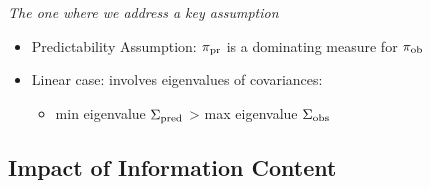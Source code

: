 \begin{frame}{\it The one where we address a key assumption}

\begin{itemize}
  \item Predictability Assumption: $\operatorname*{\pi_{pr}}$ is a dominating measure for $\operatorname*{\pi_{ob}}$
  \bigskip
  \bigskip
  \item Linear case: involves eigenvalues of covariances:
  \bigskip
    \begin{itemize}
      \item min eigenvalue $\Sigma_\text{pred}$ > max eigenvalue $\Sigma_\text{obs}$
    \end{itemize}
\end{itemize}
\end{frame}

\subsection{Impact of Information Content}

